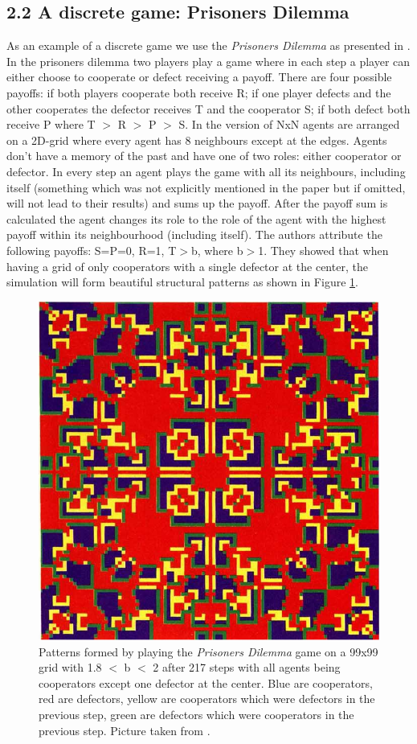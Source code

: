 \subsection{2.2 A discrete game: Prisoners Dilemma}
As an example of a discrete game we use the \textit{Prisoners Dilemma} as presented in \cite{nowak_evolutionary_1992}. In the prisoners dilemma two players play a game where in each step a player can either choose to cooperate or defect receiving a payoff. There are four possible payoffs: if both players cooperate both receive R; if one player defects and the other cooperates the defector receives T and the cooperator S; if both defect both receive P where T $>$ R $>$ P $>$ S.
In the version of \cite{nowak_evolutionary_1992} NxN agents are arranged on a 2D-grid where every agent has 8 neighbours except at the edges. Agents don't have a memory of the past and have one of two roles: either cooperator or defector. In every step an agent plays the game with all its neighbours, including itself (something which was not explicitly mentioned in the paper but if omitted, will not lead to their results) and sums up the payoff. After the payoff sum is calculated the agent changes its role to the role of the agent with the highest payoff within its neighbourhood (including itself). The authors attribute the following payoffs: S=P=0, R=1, T$>$b, where b$>$1. They showed that when having a grid of only cooperators with a single defector at the center, the simulation will form beautiful structural patterns as shown in Figure \ref{fig:sync_patterns}.

\begin{figure}
	\centering
	\includegraphics[width=.4\textwidth, angle=0]{./fig/sync_patterns.png}
	\caption{Patterns formed by playing the \textit{Prisoners Dilemma} game on a 99x99 grid with 1.8 $<$ b $<$ 2 after 217 steps with all agents being cooperators except one defector at the center. Blue are cooperators, red are defectors, yellow are cooperators which were defectors in the previous step, green are defectors which were cooperators in the previous step. Picture taken from \cite{nowak_evolutionary_1992}.}
	\label{fig:sync_patterns}
\end{figure}

